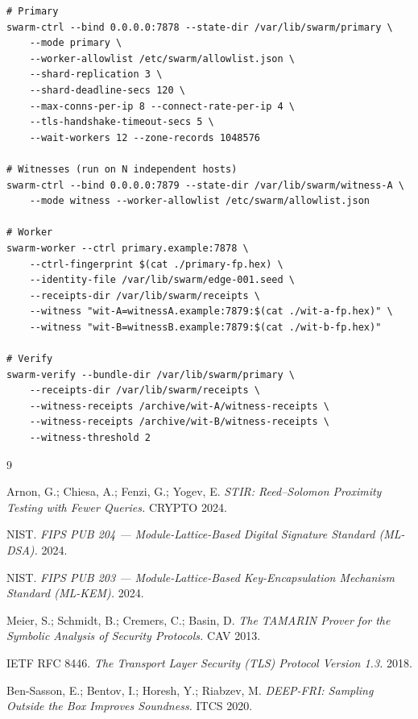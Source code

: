 \documentclass[11pt,a4paper]{article}
\theoremstyle{definition}
\theoremstyle{plain}
\begin{document}
\begin{lstlisting}[caption={Representative production deployment.},label=lst:deploy]
# Primary
swarm-ctrl --bind 0.0.0.0:7878 --state-dir /var/lib/swarm/primary \
    --mode primary \
    --worker-allowlist /etc/swarm/allowlist.json \
    --shard-replication 3 \
    --shard-deadline-secs 120 \
    --max-conns-per-ip 8 --connect-rate-per-ip 4 \
    --tls-handshake-timeout-secs 5 \
    --wait-workers 12 --zone-records 1048576

# Witnesses (run on N independent hosts)
swarm-ctrl --bind 0.0.0.0:7879 --state-dir /var/lib/swarm/witness-A \
    --mode witness --worker-allowlist /etc/swarm/allowlist.json

# Worker
swarm-worker --ctrl primary.example:7878 \
    --ctrl-fingerprint $(cat ./primary-fp.hex) \
    --identity-file /var/lib/swarm/edge-001.seed \
    --receipts-dir /var/lib/swarm/receipts \
    --witness "wit-A=witnessA.example:7879:$(cat ./wit-a-fp.hex)" \
    --witness "wit-B=witnessB.example:7879:$(cat ./wit-b-fp.hex)"

# Verify
swarm-verify --bundle-dir /var/lib/swarm/primary \
    --receipts-dir /var/lib/swarm/receipts \
    --witness-receipts /archive/wit-A/witness-receipts \
    --witness-receipts /archive/wit-B/witness-receipts \
    --witness-threshold 2
\end{lstlisting}

\begin{thebibliography}{9}

\bibitem{stir}
Arnon, G.; Chiesa, A.; Fenzi, G.; Yogev, E.
\emph{STIR: Reed--Solomon Proximity Testing with Fewer Queries.}
CRYPTO 2024.

NIST.
\emph{FIPS PUB 204 — Module-Lattice-Based Digital Signature Standard
       (ML-DSA).}
2024.

\bibitem{fips203}
NIST.
\emph{FIPS PUB 203 — Module-Lattice-Based Key-Encapsulation Mechanism
       Standard (ML-KEM).}
2024.

Meier, S.; Schmidt, B.; Cremers, C.; Basin, D.
\emph{The TAMARIN Prover for the Symbolic Analysis of Security
       Protocols.}
CAV 2013.

IETF RFC 8446.
\emph{The Transport Layer Security (TLS) Protocol Version 1.3.}
2018.

\bibitem{deepali}
Ben-Sasson, E.; Bentov, I.; Horesh, Y.; Riabzev, M.
\emph{DEEP-FRI: Sampling Outside the Box Improves Soundness.}
ITCS 2020.

\end{thebibliography}
\end{document}
